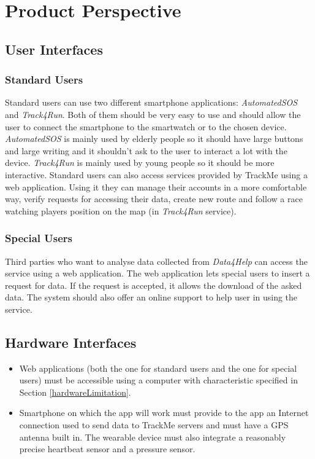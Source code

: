 \section{Product Perspective}

\subsection{User Interfaces}\label{userInterfaces}

\subsubsection{Standard Users}
Standard users can use two different smartphone applications: \textit{AutomatedSOS} and \textit{Track4Run}.
Both of them should be very easy to use and should allow the user to connect the smartphone to the smartwatch or to the chosen device.
\textit{AutomatedSOS} is mainly used by elderly people so it should have large buttons and large writing and it shouldn't ask to the user to interact a lot with the device.
\textit{Track4Run} is mainly used by young people so it should be more interactive.
Standard users can also access services provided by TrackMe using a web application. Using it they can manage their accounts in a more comfortable way, verify requests for accessing their data, create new route and follow a race watching players position on the map (in \textit{Track4Run} service).

\subsubsection{Special Users}
Third parties who want to analyse data collected from \textit{Data4Help} can access the service using a web application.
The web application lets special users to insert a request for data.
If the request is accepted, it allows the download of the asked data.
The system should also offer an online support to help user in using the service.

\subsection{Hardware Interfaces}\label{hardwareInterfaces}
\begin{itemize}
\item Web applications (both the one for standard users and the one for special users) must be accessible using a computer with characteristic specified in Section \ref{hardwareLimitation}.
\item Smartphone on which the app will work must provide to the app an Internet connection used to send data to TrackMe servers and must have a GPS antenna built in.
The wearable device must also integrate a reasonably precise heartbeat sensor and a pressure sensor.
\end{itemize}

